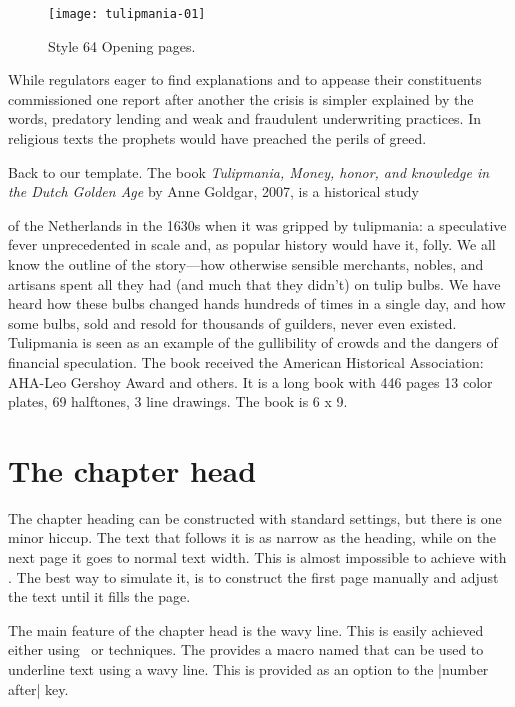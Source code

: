 \begin{figure}[ht]
\centering
\texttt{[image: tulipmania-01]}
\caption{Style 64 Opening pages.}
\end{figure}

While regulators eager to find explanations and to appease their constituents commissioned one report after another the crisis is simpler explained by the words, predatory lending and weak and fraudulent underwriting practices. In religious texts the prophets would have preached the perils of greed.

Back to our template. The book 
\emph{Tulipmania,
Money, honor, and knowledge in the Dutch Golden Age}
by Anne Goldgar, 2007, is a historical study

\restoregeometry
\newpage

\noindent of the  Netherlands in the 1630s when it was gripped by tulipmania: a speculative fever unprecedented in scale and, as popular history would have it, folly. We all know the outline of the story—how otherwise sensible merchants, nobles, and artisans spent all they had (and much that they didn’t) on tulip bulbs. We have heard how these bulbs changed hands hundreds of times in a single day, and how some bulbs, sold and resold for thousands of guilders, never even existed. Tulipmania is seen as an example of the gullibility of crowds and the dangers of financial speculation. The book received the 
American Historical Association: AHA-Leo Gershoy Award and others. It is a long book with 446 pages 13 color plates, 69 halftones, 3 line drawings. The book is  6 x 9. 

\section{The chapter head}

The chapter heading can be constructed with standard settings, but there is one minor hiccup. The text that follows it is as narrow as the heading, while on the next page it goes to normal text width. This is almost impossible to achieve with \tex. The best way to simulate it, is to construct the first page manually and adjust the text until it fills the page.

The main feature of the chapter head is the wavy line. This is easily achieved either using \tikzname\ or \tex techniques. The  provides a macro named \cmd{\uwave} that can be used to underline text using a wavy line. This is provided as an option to the |number after| key. 

